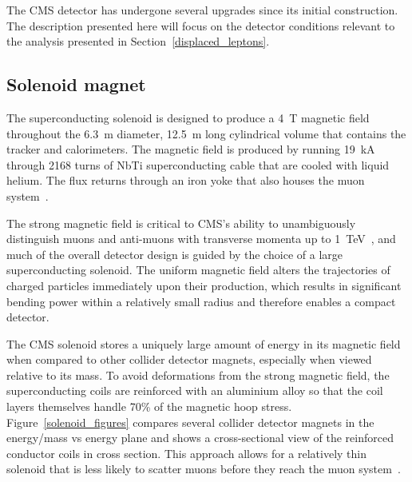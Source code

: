 The CMS detector has undergone several upgrades since its initial construction. The description presented here will focus on the detector conditions relevant to the analysis presented in Section~\ref{displaced_leptons}.

\subsection{Solenoid magnet}
The superconducting solenoid is designed to produce a \SI{4}{\tesla} magnetic field throughout the \SI{6.3}{\metre} diameter, \SI{12.5}{\metre} long cylindrical volume that contains the tracker and calorimeters. The magnetic field is produced by running \SI{19}{\kA} through 2168 turns of NbTi superconducting cable that are cooled with liquid helium. The flux returns through an iron yoke that also houses the muon system~\cite{cms_experiment}.

The strong magnetic field is critical to CMS's ability to unambiguously distinguish muons and anti-muons with transverse momenta up to \SI{1}{\TeV}~\cite{cms_tdr_v1}, and much of the overall detector design is guided by the choice of a large superconducting solenoid. The uniform magnetic field alters the trajectories of charged particles immediately upon their production, which results in significant bending power within a relatively small radius and therefore enables a compact detector.

The CMS solenoid stores a uniquely large amount of energy in its magnetic field when compared to other collider detector magnets, especially when viewed relative to its mass. To avoid deformations from the strong magnetic field, the superconducting coils are reinforced with an aluminium alloy so that the coil layers themselves handle 70\% of the magnetic hoop stress. Figure~\ref{solenoid_figures} compares several collider detector magnets in the energy/mass vs energy plane and shows a cross-sectional view of the reinforced conductor coils in cross section. This approach allows for a relatively thin solenoid that is less likely to scatter muons before they reach the muon system~\cite{cms_experiment}. 



